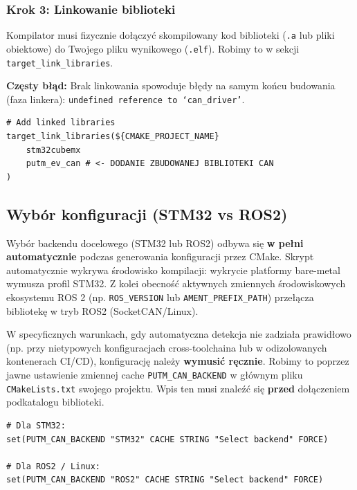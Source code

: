 \documentclass[a4paper,11pt]{article}
\begin{document}
\begin{stm32box}
\subsubsection*{Krok 3: Linkowanie biblioteki}
Kompilator musi fizycznie dołączyć skompilowany kod biblioteki (\texttt{.a} lub pliki obiektowe) do Twojego pliku wynikowego (\texttt{.elf}). Robimy to w sekcji \texttt{target\_link\_libraries}.

\textcolor{warningred}{\textbf{Częsty błąd:}} Brak linkowania spowoduje błędy na samym końcu budowania (faza linkera): \texttt{undefined reference to `can\_driver'}. 

\begin{lstlisting}[style=cmakestyle]
# Add linked libraries
target_link_libraries(${CMAKE_PROJECT_NAME} 
    stm32cubemx
    putm_ev_can # <- DODANIE ZBUDOWANEJ BIBLIOTEKI CAN
)
\end{lstlisting}
\end{stm32box}

\vspace{1em}

\begin{commonbox}
\subsection*{Wybór konfiguracji (STM32 vs ROS2)}
Wybór backendu docelowego (STM32 lub ROS2) odbywa się \textbf{w pełni automatycznie} podczas generowania konfiguracji przez CMake. Skrypt automatycznie wykrywa środowisko kompilacji: wykrycie platformy bare-metal wymusza profil STM32. Z kolei obecność aktywnych zmiennych środowiskowych ekosystemu ROS 2 (np. \texttt{ROS\_VERSION} lub \texttt{AMENT\_PREFIX\_PATH}) przełącza bibliotekę w tryb ROS2 (SocketCAN/Linux).

W specyficznych warunkach, gdy automatyczna detekcja nie zadziała prawidłowo (np. przy nietypowych konfiguracjach cross-toolchaina lub w odizolowanych kontenerach CI/CD), konfigurację należy \textbf{wymusić ręcznie}. Robimy to poprzez jawne ustawienie zmiennej cache \texttt{PUTM\_CAN\_BACKEND} w głównym pliku \texttt{CMakeLists.txt} swojego projektu. Wpis ten musi znaleźć się \textbf{przed} dołączeniem podkatalogu biblioteki.

\begin{lstlisting}[style=cmakestyle, caption=Wymuszanie konfiguracji w CMake]
# Dla STM32:
set(PUTM_CAN_BACKEND "STM32" CACHE STRING "Select backend" FORCE)

# Dla ROS2 / Linux:
set(PUTM_CAN_BACKEND "ROS2" CACHE STRING "Select backend" FORCE)
\end{lstlisting}
\end{commonbox}
\end{document}
